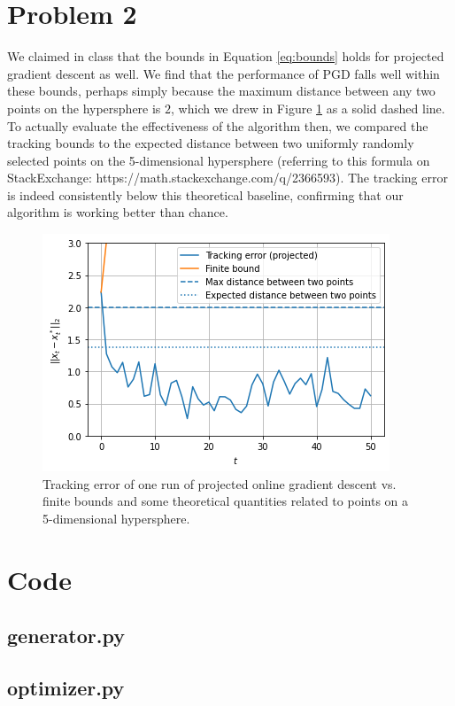 \documentclass[12pt]{article}
\begin{document}
\section*{Problem 2}%
\label{sec:Problem 2}

We claimed in class that the bounds in Equation \ref{eq:bounds} holds for projected gradient descent as well. We find that the performance of PGD falls well within these bounds, perhaps simply because the maximum distance between any two points on the hypersphere is $2$, which we drew in Figure \ref{fig:p2} as a solid dashed line. To actually evaluate the effectiveness of the algorithm then, we compared the tracking bounds to the expected distance between two
uniformly randomly selected points on the 5-dimensional hypersphere (referring to this formula on StackExchange: https://math.stackexchange.com/q/2366593). The tracking error is indeed consistently below this theoretical baseline, confirming that our algorithm is working better than chance.

\begin{figure}[h]
\begin{center}
    \includegraphics[scale=0.5]{figures/hw4-p2.png}
\end{center}
\caption{Tracking error of one run of projected online gradient descent vs. finite bounds and some theoretical quantities related to points on a 5-dimensional hypersphere.}
\label{fig:p2}
\end{figure}

\section*{Code}
\label{sec:Code}

\subsection*{generator.py}

\subsection*{optimizer.py}

\end{document}
